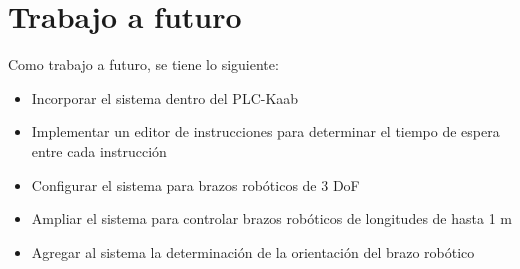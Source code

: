 \section{Trabajo a futuro}

Como trabajo a futuro, se tiene lo siguiente:

\begin{itemize}
	\item Incorporar el sistema dentro del PLC-Kaab
	\item Implementar un editor de instrucciones para determinar el tiempo de espera entre cada instrucción
	\item Configurar el sistema para brazos robóticos de 3 DoF
	\item Ampliar el sistema para controlar brazos robóticos de longitudes de hasta 1 m
	\item Agregar al sistema la determinación de la orientación del brazo robótico
\end{itemize}
